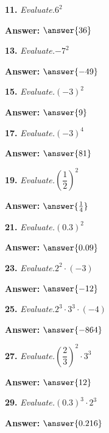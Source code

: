 \documentclass{ximera}
\begin{document}
\begin{problem}
\textbf{11.} \emph{Evaluate.}\quad $6^2$

\textbf{Answer:} $\answer{36}$
\end{problem}

\begin{problem}
\textbf{13.} \emph{Evaluate.}\quad $-7^2$

\textbf{Answer:} $\answer{-49}$
\end{problem}

\begin{problem}
\textbf{15.} \emph{Evaluate.}\quad $(-3)^2$

\textbf{Answer:} $\answer{9}$
\end{problem}

\begin{problem}
\textbf{17.} \emph{Evaluate.}\quad $(-3)^4$

\textbf{Answer:} $\answer{81}$
\end{problem}

\begin{problem}
\textbf{19.} \emph{Evaluate.}\quad $\left(\dfrac{1}{2}\right)^{2}$

\textbf{Answer:} $\answer{\frac{1}{4}}$
\end{problem}

\begin{problem}
\textbf{21.} \emph{Evaluate.}\quad $(0.3)^2$

\textbf{Answer:} $\answer{0.09}$
\end{problem}

\begin{problem}
\textbf{23.} \emph{Evaluate.}\quad $2^2 \cdot (-3)$

\textbf{Answer:} $\answer{-12}$
\end{problem}

\begin{problem}
\textbf{25.} \emph{Evaluate.}\quad $2^3 \cdot 3^3 \cdot (-4)$

\textbf{Answer:} $\answer{-864}$
\end{problem}

\begin{problem}
\textbf{27.} \emph{Evaluate.}\quad $\left(\dfrac{2}{3}\right)^{2} \cdot 3^3$

\textbf{Answer:} $\answer{12}$
\end{problem}

\begin{problem}
\textbf{29.} \emph{Evaluate.}\quad $(0.3)^3 \cdot 2^3$

\textbf{Answer:} $\answer{0.216}$
\end{problem}
\end{document}
